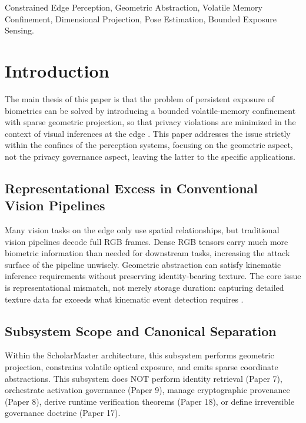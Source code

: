 \documentclass[conference]{IEEEtran}
\begin{document}
\begin{IEEEkeywords}
Constrained Edge Perception, Geometric Abstraction, Volatile Memory Confinement, Dimensional Projection, Pose Estimation, Bounded Exposure Sensing.
\end{IEEEkeywords}

\section{Introduction}

The main thesis of this paper is that the problem of persistent exposure of biometrics can be solved by introducing a bounded volatile-memory confinement with sparse geometric projection, so that privacy violations are minimized in the context of visual inferences at the edge \cite{b25}. This paper addresses the issue strictly within the confines of the perception systems, focusing on the geometric aspect, not the privacy governance aspect, leaving the latter to the specific applications.

\subsection{Representational Excess in Conventional Vision Pipelines}
Many vision tasks on the edge only use spatial relationships, but traditional vision pipelines decode full RGB frames. Dense RGB tensors carry much more biometric information than needed for downstream tasks, increasing the attack surface of the pipeline unwisely. Geometric abstraction can satisfy kinematic inference requirements without preserving identity-bearing texture. The core issue is representational mismatch, not merely storage duration: capturing detailed texture data far exceeds what kinematic event detection requires \cite{b1}.

\subsection{Subsystem Scope and Canonical Separation}
Within the ScholarMaster architecture, this subsystem performs geometric projection, constrains volatile optical exposure, and emits sparse coordinate abstractions. This subsystem does NOT perform identity retrieval (Paper 7), orchestrate activation governance (Paper 9), manage cryptographic provenance (Paper 8), derive runtime verification theorems (Paper 18), or define irreversible governance doctrine (Paper 17). 
\end{document}
